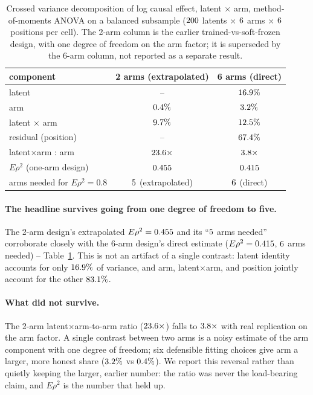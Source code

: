 \documentclass[11pt]{article}
\begin{document}
\begin{table}[t]\centering
\begin{tabular}{lcc}
\toprule
component & 2 arms (extrapolated) & 6 arms (direct) \\
\midrule
latent                     & --              & $16.9\%$ \\
arm                        & $0.4\%$   & $3.2\%$ \\
latent $\times$ arm        & $9.7\%$ & $12.5\%$ \\
residual (position)        & --              & $67.4\%$ \\
latent$\times$arm : arm    & $23.6\times$ & $3.8\times$ \\
$E\rho^2$ (one-arm design)  & $0.455$    & $0.415$ \\
arms needed for $E\rho^2=0.8$ & $5$ (extrapolated) & $6$ (direct) \\
\bottomrule
\end{tabular}
\caption{Crossed variance decomposition of log causal effect, latent $\times$
arm, method-of-moments ANOVA on a balanced subsample
($200$ latents $\times$ $6$ arms $\times$ $6$ positions per
cell). The 2-arm column is the earlier trained-vs-soft-frozen design, with one
degree of freedom on the arm factor; it is superseded by the 6-arm column, not
reported as a separate result.}
\label{tab:decomp}
\end{table}

\paragraph{The headline survives going from one degree of freedom to five.}
The 2-arm design's extrapolated $E\rho^2=0.455$ and its ``$5$
arms needed'' corroborate closely with the 6-arm design's direct estimate
($E\rho^2=0.415$, $6$ arms needed) -- Table~\ref{tab:decomp}.
This is not an artifact of a single contrast: latent identity accounts for only
$16.9\%$ of variance, and arm, latent$\times$arm, and position
jointly account for the other $83.1\%$.

\paragraph{What did not survive.} The 2-arm latent$\times$arm-to-arm ratio
($23.6\times$) falls to $3.8\times$ with real replication on
the arm factor. A single contrast between two arms is a noisy estimate of the
arm component with one degree of freedom; six defensible fitting choices give
arm a larger, more honest share ($3.2\%$ vs $0.4\%$). We
report this reversal rather than quietly keeping the larger, earlier number:
the ratio was never the load-bearing claim, and $E\rho^2$ is the number that
held up.
\end{document}
